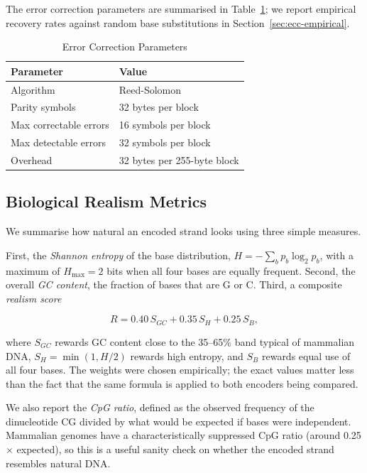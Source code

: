 \documentclass[conference]{IEEEtran}
\begin{document}
The error correction parameters are summarised in Table~\ref{tab:ecc}; we report empirical recovery rates against random base substitutions in Section~\ref{sec:ecc-empirical}.

\begin{table}[htbp]
\caption{Error Correction Parameters}
\begin{center}
\begin{tabular}{|l|l|}
\hline
\textbf{Parameter} & \textbf{Value} \\
\hline
Algorithm & Reed-Solomon \\
\hline
Parity symbols & 32 bytes per block \\
\hline
Max correctable errors & 16 symbols per block \\
\hline
Max detectable errors & 32 symbols per block \\
\hline
Overhead & 32 bytes per 255-byte block \\
\hline
\end{tabular}
\label{tab:ecc}
\end{center}
\end{table}

\subsection{Biological Realism Metrics}

We summarise how natural an encoded strand looks using three simple measures.

First, the \emph{Shannon entropy} of the base distribution, $H = -\sum_{b} p_b \log_2 p_b$, with a maximum of $H_{\max} = 2$ bits when all four bases are equally frequent. Second, the overall \emph{GC content}, the fraction of bases that are G or C. Third, a composite \emph{realism score}

\begin{equation}
R = 0.40 \, S_{GC} + 0.35 \, S_H + 0.25 \, S_B,
\label{eq:realism}
\end{equation}

\noindent where $S_{GC}$ rewards GC content close to the 35--65\% band typical of mammalian DNA, $S_H = \min(1, H/2)$ rewards high entropy, and $S_B$ rewards equal use of all four bases. The weights were chosen empirically; the exact values matter less than the fact that the same formula is applied to both encoders being compared.

We also report the \emph{CpG ratio}, defined as the observed frequency of the dinucleotide CG divided by what would be expected if bases were independent. Mammalian genomes have a characteristically suppressed CpG ratio (around 0.25$\times$ expected), so this is a useful sanity check on whether the encoded strand resembles natural DNA.
\end{document}
